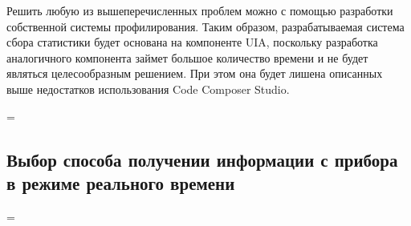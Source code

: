 
Решить любую из вышеперечисленных проблем можно с помощью разработки собственной
системы профилирования. Таким образом, разрабатываемая система сбора статистики
будет основана на компоненте UIA,
поскольку разработка аналогичного компонента займет большое количество времени
и не будет являться целесообразным решением. При этом она будет лишена описанных
выше недостатков использования Code Composer Studio.



\newdimen\origiwstr
\origiwstr=\font
{}\origiwstr
\subsection{Выбор способа получении информации с прибора в режиме реального времени}
\font=\origiwstr

